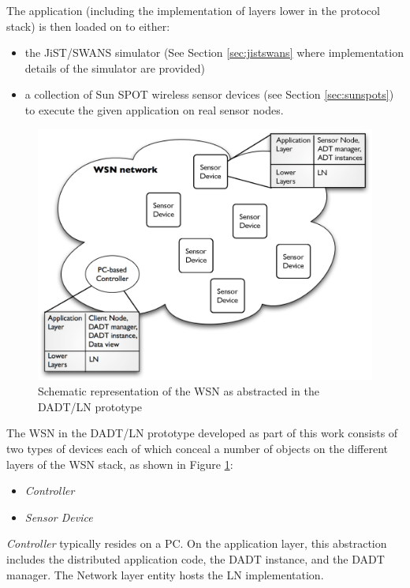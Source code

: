 The application (including the implementation of layers lower in the protocol
stack) is then loaded on to either:
\begin{itemize}
\item the JiST/SWANS simulator \cite{barr_JIST:2005, barr_SWANS} (See Section
\ref{sec:jistswans} where implementation details of the simulator are provided) 
\item a collection of Sun SPOT wireless sensor devices
\cite{simon_squawk:2006} (see Section \ref{sec:sunspots}) to execute the given 
application on real sensor nodes.
\end{itemize}

\begin{figure}
\centering
\includegraphics[scale=0.55]{img/DADTLN_glossary.eps} 
\caption[WSN in DADT/LN prototype]{Schematic representation of the WSN as
abstracted in the DADT/LN prototype}
\label{Fig:DADTLN_glossary}
\end{figure} 

The WSN in the DADT/LN prototype developed as part of
this work consists of two types of devices each of which conceal a number
of objects on the different layers of the WSN stack, as shown in Figure
\ref{Fig:DADTLN_glossary}:
\begin{itemize}
  \item \emph{Controller}
  \item \emph{Sensor Device}
\end{itemize}  
   
\emph{Controller} typically resides on a PC. On the application layer, this
abstraction includes the distributed application code, the DADT
instance, and the DADT manager. The Network layer entity hosts the LN implementation.
  
